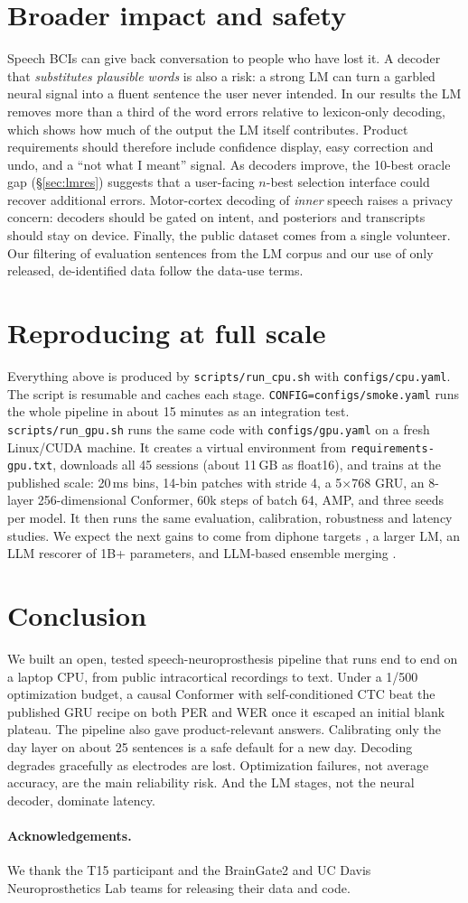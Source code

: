 \section{Broader impact and safety}
\label{sec:impact}
Speech BCIs can give back conversation to people who have lost it. A decoder that \emph{substitutes plausible words} is also a risk: a strong LM can turn a garbled neural signal into a fluent sentence the user never intended. In our results the LM removes more than a third of the word errors relative to lexicon-only decoding, which shows how much of the output the LM itself contributes. Product requirements should therefore include confidence display, easy correction and undo, and a ``not what I meant'' signal. As decoders improve, the 10-best oracle gap (\S\ref{sec:lmres}) suggests that a user-facing $n$-best selection interface could recover additional errors.
Motor-cortex decoding of \emph{inner} speech \citep{kunz2025inner} raises a privacy concern: decoders should be gated on intent, and posteriors and transcripts should stay on device. Finally, the public dataset comes from a single volunteer. Our filtering of evaluation sentences from the LM corpus and our use of only released, de-identified data follow the data-use terms.

\section{Reproducing at full scale}
\label{sec:repro}
Everything above is produced by \texttt{scripts/run\_cpu.sh} with \texttt{configs/cpu.yaml}. The script is resumable and caches each stage. \texttt{CONFIG=configs/smoke.yaml} runs the whole pipeline in about 15 minutes as an integration test.
\texttt{scripts/run\_gpu.sh} runs the same code with \texttt{configs/gpu.yaml} on a fresh Linux/CUDA machine. It creates a virtual environment from \texttt{requirements-gpu.txt}, downloads all 45 sessions (about 11\,GB as float16), and trains at the published scale: 20\,ms bins, 14-bin patches with stride 4, a 5$\times$768 GRU, an 8-layer 256-dimensional Conformer, 60k steps of batch 64, AMP, and three seeds per model. It then runs the same evaluation, calibration, robustness and latency studies. We expect the next gains to come from diphone targets \citep{li2024dcond}, a larger LM, an LLM rescorer of 1B+ parameters, and LLM-based ensemble merging \citep{willett2024b2t}.

\section{Conclusion}
We built an open, tested speech-neuroprosthesis pipeline that runs end to end on a laptop CPU, from public intracortical recordings to text. Under a 1/500 optimization budget, a causal Conformer with self-conditioned CTC beat the published GRU recipe on both PER and WER once it escaped an initial blank plateau. The pipeline also gave product-relevant answers. Calibrating only the day layer on about 25 sentences is a safe default for a new day. Decoding degrades gracefully as electrodes are lost. Optimization failures, not average accuracy, are the main reliability risk. And the LM stages, not the neural decoder, dominate latency.

\paragraph{Acknowledgements.} We thank the T15 participant and the BrainGate2 and UC Davis Neuroprosthetics Lab teams for releasing their data and code.
